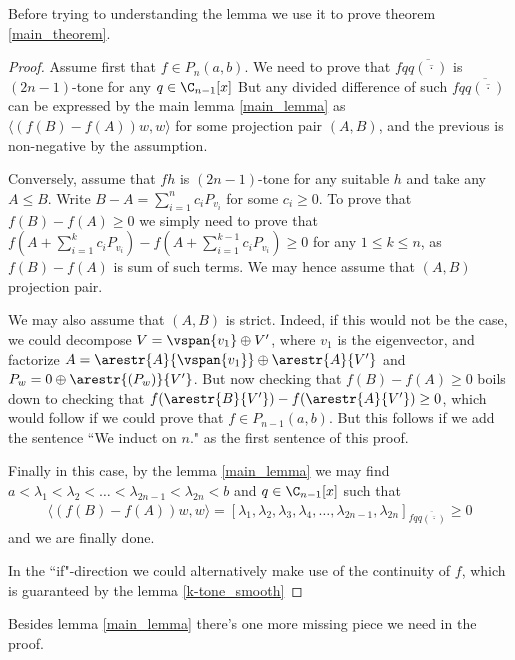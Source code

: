 Before trying to understanding the lemma we use it to prove theorem \ref{main_theorem}.

\begin{proof}
	Assume first that $f \in P_{n}(a, b)$. We need to prove that $f q \overline{q(\overline{\cdot})}$ is $(2 n - 1)$-tone for any $q \in \C_{n - 1}[x]$ But any divided difference of such $f q \overline{q(\overline{\cdot})}$ can be expressed by the main lemma \ref{main_lemma} as $\langle (f(B) - f(A)) w, w \rangle$ for some projection pair $(A, B)$, and the previous is non-negative by the assumption.

	Conversely, assume that $f h$ is $(2 n - 1)$-tone for any suitable $h$ and take any $A \leq B$. Write $B - A = \sum_{i = 1}^{n} c_{i} P_{v_{i}}$ for some $c_{i} \geq 0$. To prove that $f(B) - f(A) \geq 0$ we simply need to prove that $f(A + \sum_{i = 1}^{k} c_{i} P_{v_{i}}) - f(A + \sum_{i = 1}^{k - 1} c_{i} P_{v_{i}}) \geq 0$ for any $1 \leq k \leq n$, as $f(B) - f(A)$ is sum of such terms. We may hence assume that $(A, B)$ projection pair.

	We may also assume that $(A, B)$ is strict. Indeed, if this would not be the case, we could decompose $V = \vspan\{v_{1}\} \oplus V'$, where $v_{1}$ is the eigenvector, and factorize $A = \arestr{A}{\vspan\{v_{1}\}} \oplus \arestr{A}{V'}$ and $P_{w} = 0 \oplus \arestr{(P_{w})}{V'}$. But now checking that $f(B) - f(A) \geq 0$ boils down to checking that $f(\arestr{B}{V'}) - f(\arestr{A}{V'}) \geq 0$, which would follow if we could prove that $f \in P_{n - 1}(a, b)$. But this follows if we add the sentence ``We induct on $n$." as the first sentence of this proof.

	Finally in this case, by the lemma \ref{main_lemma} we may find $a < \lambda_{1} < \lambda_{2} < \ldots < \lambda_{2 n - 1} < \lambda_{2 n} < b$ and $q \in \C_{n - 1}[x]$ such that
	\begin{align*}
		\langle (f(B) - f(A)) w, w \rangle = [\lambda_{1}, \lambda_{2}, \lambda_{3}, \lambda_{4}, \ldots, \lambda_{2n - 1}, \lambda_{2 n}]_{f q \overline{q(\overline{\cdot})}} \geq 0
	\end{align*}
	and we are finally done.

	In the ``if"-direction we could alternatively make use of the continuity of $f$, which is guaranteed by the lemma \ref{k-tone_smooth}

\end{proof}

Besides lemma \ref{main_lemma} there's one more missing piece we need in the proof.

